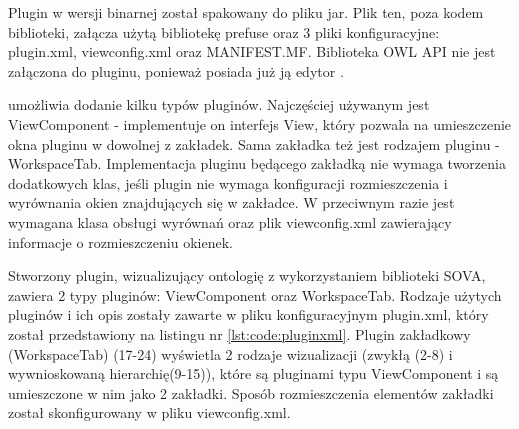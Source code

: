 Plugin w wersji binarnej został spakowany do pliku jar. Plik ten, poza kodem biblioteki, załącza  użytą bibliotekę prefuse oraz 3 pliki konfiguracyjne: plugin.xml, 
viewconfig.xml  oraz MANIFEST.MF. Biblioteka OWL API nie jest załączona do pluginu, ponieważ posiada już ją edytor \protege. 

 umożliwia dodanie kilku typów pluginów. Najczęściej używanym jest ViewComponent - implementuje on interfejs View, który pozwala na umieszczenie okna 
pluginu w dowolnej z zakładek. Sama zakładka też jest rodzajem pluginu - WorkspaceTab. Implementacja pluginu będącego zakładką nie wymaga tworzenia dodatkowych 
klas, jeśli plugin nie wymaga konfiguracji rozmieszczenia i wyrównania okien znajdujących się w zakładce. W przeciwnym razie jest wymagana klasa obsługi wyrównań 
oraz plik viewconfig.xml zawierający informacje o rozmieszczeniu okienek. 

Stworzony plugin, wizualizujący ontologię z wykorzystaniem biblioteki SOVA, zawiera 2 typy pluginów: ViewComponent oraz WorkspaceTab. Rodzaje użytych pluginów i ich opis 
zostały zawarte w pliku konfiguracyjnym plugin.xml, który został  przedstawiony na listingu nr \ref{lst:code:pluginxml}. Plugin zakładkowy (WorkspaceTab) (17-24) wyświetla 
2 rodzaje wizualizacji (zwykłą (2-8) i wywnioskowaną hierarchię(9-15)), które są pluginami typu ViewComponent i są umieszczone w nim jako 2 zakładki. Sposób rozmieszczenia 
elementów zakładki został skonfigurowany w pliku viewconfig.xml. 






 
